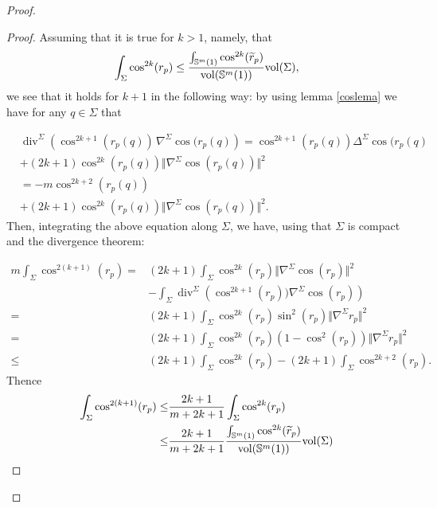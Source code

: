\documentclass{amsart}
\theoremstyle{definition}
\theoremstyle{remark}
\newcommand{\Div}{\operatorname{div}}
\begin{document}
\begin{proof}
\begin{proof}
Assuming that it is true for $k >1$, namely, that
\begin{equation}\label{eqsisBis}
\int_\Sigma \cos^{2k}(r_p) \leq \frac{\int_{\mathbb{S}^m(1)} \cos^{2k}(\widetilde{r}_p)}{{\rm vol}(\mathbb{S}^m(1))} {\rm vol}(\Sigma),
\end{equation}
we see that it holds for $k+1$ in the following way: by using lemma \ref{coslema}  we have  for any $q\in \Sigma$ that

\begin{equation}
\begin{aligned}
&\Div^\Sigma\left(\cos^{2k+1} (r_p(q))\,\nabla^\Sigma \cos(r_p(q)\right)=\cos^{2k+1}(r_p(q))\Delta^\Sigma\cos(r_p(q)\\&+(2k+1) \cos^{2k}(r_p(q))\Vert \nabla^\Sigma \cos(r_p(q))\Vert^2\\
&=-m\cos^{2k+2}(r_p(q))\\&+(2k+1) \cos^{2k}(r_p(q))\Vert \nabla^\Sigma \cos(r_p(q))\Vert^2.
\end{aligned}
\end{equation}
Then, integrating the above equation  along $\Sigma$, we have, using that $\Sigma$ is compact and the divergence theorem:

\begin{equation}\label{eqdossBis}
\begin{aligned}
m\int_\Sigma \cos^{2(k+1)}(r_p)=&(2k+1)\int_\Sigma\cos^{2k}(r_p)\Vert \nabla^{\Sigma}  \cos(r_p)\Vert^2\\&-\int_\Sigma \Div^\Sigma\left(\cos^{2k+1}(r_p))\nabla^\Sigma \cos(r_p)\right)
\\
=&(2k+1)\int_\Sigma \cos^{2k}(r_p)\sin^2(r_p)\Vert \nabla^{\Sigma} r_p\Vert^2\\
=&(2k+1)\int_\Sigma \cos^{2k}(r_p)\left(1-\cos^2(r_p)\right)\Vert \nabla^{\Sigma} r_p\Vert^2\\
\leq& (2k+1)\int_\Sigma \cos^{2k}(r_p)-(2k+1)\int_\Sigma \cos^{2k+2}(r_p).
\end{aligned}
\end{equation}
Thence
\begin{equation}\label{eqdoss2Bis}
\begin{aligned}
\int_\Sigma \cos^{2(k+1)}(r_p)\leq &\frac{2k+1}{m+2k+1}\int_\Sigma \cos^{2k}(r_p)\\ 
\leq&  \frac{2k+1}{m+2k+1}\frac{\int_{\mathbb{S}^m(1)} \cos^{2k}(\widetilde{r}_p)}{{\rm vol}(\mathbb{S}^m(1))} {\rm vol}(\Sigma)
\end{aligned}
\end{equation}


\end{proof}
\end{proof}
\end{document}
